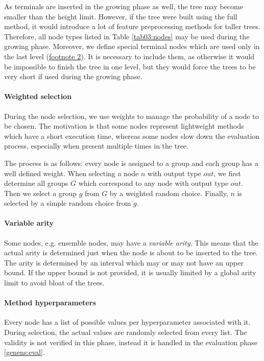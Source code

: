 As terminals are inserted in the growing phase as well, the tree may become
smaller than the height limit. However, if the tree were built using the full
method, it would introduce a lot of feature preprocessing methods for taller
trees. Therefore, all node types listed in Table \ref{tab03:nodes} may be used
during the growing phase. Moreover, we define special terminal nodes which are
used only in the last level (\hyperref[tab03:nodes]{footnote 2}). It is
necessary to include them, as otherwise it would be impossible to finish the
tree in one level, but they would force the trees to be very short if used
during the growing phase.

\paragraph{Weighted selection}
During the node selection, we use weights to manage the probability of a node
to be chosen. The motivation is that some nodes represent lightweight methods
which have a short execution time, whereas some nodes slow down the evaluation
process, especially when present multiple times in the tree.

The process is as follows: every node is assigned to a group and each group has
a well defined weight. When selecting a node $n$ with output type $out$, we 
first determine all groups $G$ which correspond to any node with output type
$out$. Then we select a group $g$ from $G$ by a weighted random choice.
Finally, $n$ is selected by a simple random choice from $g$.

\paragraph{Variable arity}
Some nodes, e.g. ensemble nodes, may have a \emph{variable arity}. This means
that the actual arity is determined just when the node is about to be inserted
to the tree. The arity is determined by an interval which may or may not have
an upper bound. If the upper bound is not provided, it is usually limited by
a global arity limit to avoid bloat of the trees.

\paragraph{Method hyperparameters}
Every node has a list of possible values per hyperparameter associated with
it. During selection, the actual values are randomly selected from every list.
The validity is not verified in this phase, instead it is handled in the
evaluation phase \ref{genens:eval}.

